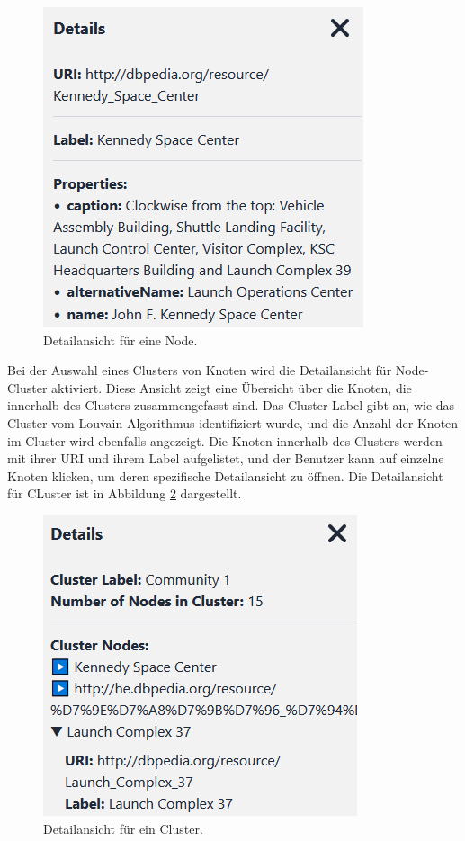 \begin{figure}[h]
    \centering
    \includegraphics[height=.5\textwidth]{images/03/NodeDetails.png}
    \caption{Detailansicht für eine Node.}
    \label{fig:realization:implementation:NodeDetails}
\end{figure}

Bei der Auswahl eines Clusters von Knoten wird die Detailansicht für Node-Cluster aktiviert. Diese Ansicht zeigt eine Übersicht über die Knoten, die innerhalb des Clusters zusammengefasst sind. Das Cluster-Label gibt an, wie das Cluster vom Louvain-Algorithmus identifiziert wurde, und die Anzahl der Knoten im Cluster wird ebenfalls angezeigt. Die Knoten innerhalb des Clusters werden mit ihrer URI und ihrem Label aufgelistet, und der Benutzer kann auf einzelne Knoten klicken, um deren spezifische Detailansicht zu öffnen. Die Detailansicht für CLuster ist in Abbildung \ref{fig:realization:implementation:ClusterDetails} dargestellt.

\begin{figure}[h]
    \centering
    \includegraphics[height=.5\textwidth]{images/03/ClusterDetails.png}
    \caption{Detailansicht für ein Cluster.}
    \label{fig:realization:implementation:ClusterDetails}
\end{figure}

